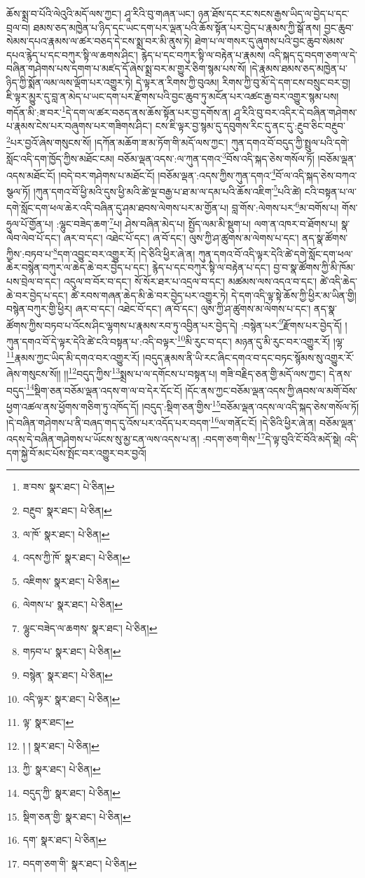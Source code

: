 ཆོས་སྨྲ་བ་པོའི་ལེའུའི་མདོ་ལས་ཀྱང་། ཤཱ་རིའི་བུ་གཞན་ཡང་། ཉན་ཐོས་དང་རང་སངས་རྒྱས་ཡིད་ལ་བྱེད་པ་དང་བྲལ་བ། ཐམས་ཅད་མཁྱེན་པ་ཉིད་དང་ཡང་དག་པར་ལྡན་པའི་ཆོས་སྟོན་པར་བྱེད་པ་རྣམས་ཀྱི་སྒོ་ནས། བྱང་ཆུབ་སེམས་དཔའ་རྣམས་ལ་ཚར་བཅད་དེ་ངས་སྨྲ་བར་མི་ནུས་ཏེ། ཐེག་པ་ལ་གསར་དུ་ཞུགས་པའི་བྱང་ཆུབ་སེམས་དཔའ་རྙེད་པ་དང་བཀུར་སྟི་ལ་ཆགས་ཤིང་། རྙེད་པ་དང་བཀུར་སྟི་ལ་བརྟེན་པ་རྣམས། འདི་སྐད་དུ་བདག་ཅག་ལ་དེ་བཞིན་གཤེགས་པས་དགག་པ་མཛད་དོ་ཞེས་སྨྲ་བར་མ་གྱུར་ཅིག་སྙམ་པས་སོ། །དེ་རྣམས་ཐམས་ཅད་མཁྱེན་པ་ཉིད་ཀྱི་སྨོན་ལམ་ལས་ལྡོག་པར་འགྱུར་ཏེ། དེ་ལྟར་ན་རིགས་ཀྱི་བུའམ། རིགས་ཀྱི་བུ་མོ་དེ་དག་ངས་བསྲུང་བར་བྱ། ཇི་ལྟར་མྱུར་དུ་བླ་ན་མེད་པ་ཡང་དག་པར་རྫོགས་པའི་བྱང་ཆུབ་ཏུ་མངོན་པར་འཚང་རྒྱ་བར་འགྱུར་སྙམ་པས། གདོན་མི་:ཟ་བར་\footnote{ཟ་བས་  སྣར་ཐང་།  པེ་ཅིན། }དེ་དག་ལ་ཚར་བཅད་ནས་ཆོས་སྟོན་པར་བྱ་དགོས་ན། ཤཱ་རིའི་བུ་བར་འདིར་དེ་བཞིན་གཤེགས་པ་རྣམས་ངེས་པར་བཞུགས་པར་གཟིགས་ཤིང་། ངས་ཇི་ལྟར་བྱ་སྙམ་དུ་དབུགས་རིང་དུ་ནང་དུ་:རྔུབ་ཅིང་བརྔུབ་\footnote{བརྔུབ་  སྣར་ཐང་།  པེ་ཅིན། }པར་བྱའོ་ཞེས་གསུངས་སོ། །དཀོན་མཆོག་ཟ་མ་ཏོག་གི་མདོ་ལས་ཀྱང་། ཀུན་དགའ་བོ་བདུད་ཀྱི་སྤྲུལ་པའི་དགེ་སློང་འདི་དག་ཁྱོད་ཀྱིས་མཐོང་ངམ། བཅོམ་ལྡན་འདས་:ལ་ཀུན་དགའ་\footnote{ལ་ཁོ་  སྣར་ཐང་།  པེ་ཅིན། }བོས་འདི་སྐད་ཅེས་གསོལ་ཏོ། །བཅོམ་ལྡན་འདས་མཐོང་ངོ། །བདེ་བར་གཤེགས་པ་མཐོང་ངོ། །བཅོམ་ལྡན་:འདས་ཀྱིས་ཀུན་དགའ་\footnote{འདས་ཀྱི་ཁོ་  སྣར་ཐང་།  པེ་ཅིན། }བོ་ལ་འདི་སྐད་ཅེས་བཀའ་སྩལ་ཏོ། །ཀུན་དགའ་བོ་ཕྱི་མའི་དུས་ཕྱི་མའི་ཚེ་ལྔ་བརྒྱ་པ་ཐ་མ་ལ་དམ་པའི་ཆོས་འཇིག་\footnote{འཇིགས་  སྣར་ཐང་།  པེ་ཅིན། }པའི་ཚེ། ངའི་བསྟན་པ་ལ་དགེ་སློང་དག་ཕལ་ཆེར་འདི་བཞིན་དུ་ཤམ་ཐབས་ལེགས་པར་མ་གྱོན་པ། བླ་གོས་:ལེགས་པར་\footnote{ལེགས་པ་  སྣར་ཐང་།  པེ་ཅིན། }མ་བགོས་པ། གོས་ཧྲུལ་པོ་གྱོན་པ། :ལྷུང་བཟེད་ཆག་\footnote{ལྷུང་བཟེད་ལ་ཆགས་  སྣར་ཐང་།  པེ་ཅིན། }པ། ཤེས་བཞིན་མེད་པ། སྤྱོད་ལམ་མི་སྡུག་པ། ལག་ན་འཁར་བ་ཐོགས་པ། སྣ་ལེབ་ལེབ་པོ་དང་། ཞར་བ་དང་། འཐེང་པོ་དང་། ཞ་བོ་དང་། ལུས་ཀྱི་ཤ་ཚུགས་མ་ལེགས་པ་དང་། ནད་སྣ་ཚོགས་ཀྱིས་:བཏབ་པ་\footnote{གཏབ་པ་  སྣར་ཐང་།  པེ་ཅིན། }དག་འབྱུང་བར་འགྱུར་རོ། །དེ་ཅིའི་ཕྱིར་ཞེ་ན། ཀུན་དགའ་བོ་འདི་ལྟར་དེའི་ཚེ་དགེ་སློང་དག་ཕལ་ཆེར་བསྙེན་བཀུར་ལ་ཆེད་ཆེ་བར་བྱེད་པ་དང་། རྙེད་པ་དང་བཀུར་སྟི་ལ་བརྟེན་པ་དང་། བྱ་བ་སྣ་ཚོགས་ཀྱི་མི་ཁོམ་པས་བྲེལ་བ་དང་། འདུལ་བ་བོར་བ་དང་། སོ་སོར་ཐར་པ་འདྲལ་བ་དང་། མཚམས་ལས་འདའ་བ་དང་། ཚེ་འདི་ཆེད་ཆེ་བར་བྱེད་པ་དང་། ཚེ་རབས་གཞན་ཆེད་མི་ཆེ་བར་བྱེད་པར་འགྱུར་ཏེ། དེ་དག་འདི་ལྟ་སྟེ་ཆོས་ཀྱི་ཕྱིར་མ་ཡིན་གྱི། བསྙེན་བཀུར་གྱི་ཕྱིར། ཞར་བ་དང་། འཐེང་བོ་དང་། ཞ་བོ་དང་། ལུས་ཀྱི་ཤ་ཚུགས་མ་ལེགས་པ་དང་། ནད་སྣ་ཚོགས་ཀྱིས་བཏབ་པ་འོངས་ཤིང་ལྷགས་པ་རྣམས་རབ་ཏུ་འབྱིན་པར་བྱེད་དེ། :བསྙེན་པར་\footnote{བསྙེན་  སྣར་ཐང་།  པེ་ཅིན། }རྫོགས་པར་བྱེད་དོ། །ཀུན་དགའ་བོ་དེ་ལྟར་དེའི་ཚེ་ངའི་བསྟན་པ་:འདི་བལྟར་\footnote{འདི་ལྟར་  སྣར་ཐང་།  པེ་ཅིན། }མི་རུང་བ་དང་། མཉན་དུ་མི་རུང་བར་འགྱུར་རོ། །ལྷ་\footnote{ལྟ་  སྣར་ཐང་། }རྣམས་ཀྱང་ཡིད་མི་དགའ་བར་འགྱུར་རོ། །བདུད་རྣམས་ནི་ཡི་རང་ཞིང་དགའ་བ་དང་བཏང་སྙོམས་སུ་འགྱུར་རོ་ཞེས་གསུངས་སོ།། །།\footnote{། །  སྣར་ཐང་།  པེ་ཅིན། }བདུད་ཀྱིས་\footnote{ཀྱི་  སྣར་ཐང་།  པེ་ཅིན། }སྨྲས་པ་ལ་དགོངས་པ་བསྟན་པ། གཟི་བརྗིད་ཅན་གྱི་མདོ་ལས་ཀྱང་། དེ་ནས་བདུད་\footnote{བདུད་ཀྱི་  སྣར་ཐང་།  པེ་ཅིན། }སྡིག་ཅན་བཅོམ་ལྡན་འདས་ག་ལ་བ་དེར་དོང་ངོ། །དོང་ནས་ཀྱང་བཅོམ་ལྡན་འདས་ཀྱི་ཞབས་ལ་མགོ་བོས་ཕྱག་འཚལ་ནས་ཕྱོགས་གཅིག་ཏུ་འཁོད་དོ། །བདུད་:སྡིག་ཅན་གྱིས་\footnote{སྡིག་ཅན་གྱི་  སྣར་ཐང་།  པེ་ཅིན། }བཅོམ་ལྡན་འདས་ལ་འདི་སྐད་ཅེས་གསོལ་ཏོ། །དེ་བཞིན་གཤེགས་པ་ནི་བཞད་གད་དུ་འོས་པར་འདོད་པར་བདག་\footnote{དག་  སྣར་ཐང་།  པེ་ཅིན། }ལ་གནོང་ངོ། །དེ་ཅིའི་ཕྱིར་ཞེ་ན། བཅོམ་ལྡན་འདས་དེ་བཞིན་གཤེགས་པ་ཡོངས་སུ་མྱ་ངན་ལས་འདས་པ་ན། :བདག་ཅག་གིས་\footnote{བདག་ཅག་གི་  སྣར་ཐང་།  པེ་ཅིན། }དེ་ལྟ་བུའི་ངོ་བོའི་མདོ་སྡེ། འདི་དག་སྐྱེ་བོ་མང་པོས་སྤོང་བར་འགྱུར་བར་བྱའོ། 